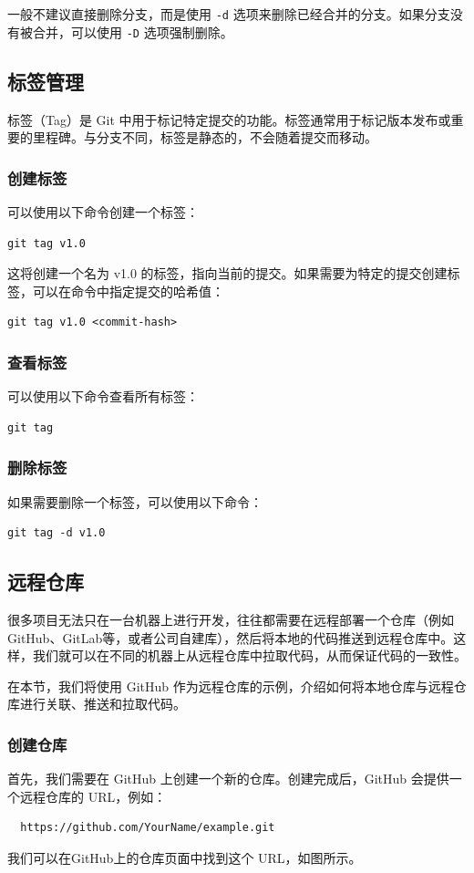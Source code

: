 \documentclass[../main.tex]{subfiles}
\begin{document}
一般不建议直接删除分支，而是使用 \texttt{-d} 选项来删除已经合并的分支。如果分支没有被合并，可以使用 \texttt{-D} 选项强制删除。

\subsection{标签管理}
标签（Tag）是 Git 中用于标记特定提交的功能。标签通常用于标记版本发布或重要的里程碑。与分支不同，标签是静态的，不会随着提交而移动。

\subsubsection{创建标签}
可以使用以下命令创建一个标签：
\begin{verbatim}
git tag v1.0
\end{verbatim}

这将创建一个名为 v1.0 的标签，指向当前的提交。如果需要为特定的提交创建标签，可以在命令中指定提交的哈希值：
\begin{verbatim}
git tag v1.0 <commit-hash>
\end{verbatim}

\subsubsection{查看标签}
可以使用以下命令查看所有标签：
\begin{verbatim}
git tag
\end{verbatim}

\subsubsection{删除标签}
如果需要删除一个标签，可以使用以下命令：
\begin{verbatim}
git tag -d v1.0
\end{verbatim}

\subsection{远程仓库}

很多项目无法只在一台机器上进行开发，往往都需要在远程部署一个仓库（例如GitHub、GitLab等，或者公司自建库），然后将本地的代码推送到远程仓库中。这样，我们就可以在不同的机器上从远程仓库中拉取代码，从而保证代码的一致性。

在本节，我们将使用 GitHub 作为远程仓库的示例，介绍如何将本地仓库与远程仓库进行关联、推送和拉取代码。

\subsubsection{创建仓库}
首先，我们需要在 GitHub 上创建一个新的仓库。创建完成后，GitHub 会提供一个远程仓库的 URL，例如：
\begin{verbatim}
  https://github.com/YourName/example.git
\end{verbatim}
我们可以在GitHub上的仓库页面中找到这个 URL，如图所示。
\end{document}
